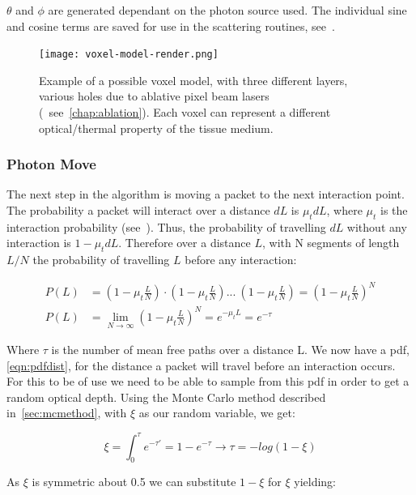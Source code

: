$\theta$ and $\phi$ are generated dependant on the photon source used. The individual sine and cosine terms are saved for use in the scattering routines, see~.
\FloatBarrier

\begin{figure}[!ht]
\centering
\texttt{[image: voxel-model-render.png]}
\caption{Example of a possible voxel model, with three different layers, various holes due to ablative pixel beam lasers (~see~\cref{chap:ablation}). Each voxel can represent a different optical/thermal property of the tissue medium.}
\label{fig:voxel-model}
\vspace{-20pt}
\end{figure}
\subsubsection*{Photon Move}\label{sec:photmove}

The next step in the algorithm is moving a packet to the next interaction point. The probability a packet will interact over a distance $dL$ is $\mu_tdL$, where $\mu_t$ is the interaction probability (see~). Thus, the probability of travelling $dL$ without any interaction is $1-\mu_tdL$. Therefore over a distance $L$, with N segments of length $L/N$ the probability of travelling $L$ before any interaction:

\begin{align}
P(L) &= (1-\mu_t\frac{L}{N}) \cdot (1-\mu_t\frac{L}{N}) ...\ (1-\mu_t\frac{L}{N}) = (1-\mu_t\frac{L}{N})^N \\
P(L) &= \lim_{N \to \infty}(1-\mu_t\frac{L}{N})^N=e^{-\mu_tL}=e^{-\tau}\label{eqn:pdfdist}
\end{align}

Where $\tau$ is the number of mean free paths over a distance L. We now have a \gls*{pdf}, \cref{eqn:pdfdist}, for the distance a packet will travel before an interaction occurs. For this to be of use we need to be able to sample from this \gls*{pdf} in order to get a random optical depth. Using the Monte Carlo method described in~\cref{sec:mcmethod}, with $\xi$ as our random variable, we get:

\begin{equation}
\xi=\int_{0}^{\tau}e^{-\tau'}=1-e^{-\tau}\rightarrow \tau=-log(1-\xi)
\end{equation}

As $\xi$ is symmetric about 0.5 we can substitute $1-\xi$ for $\xi$ yielding:

